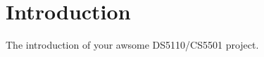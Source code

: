\section{Introduction}
\label{sec:introduction}

The introduction of your awsome DS5110/CS5501 project.

